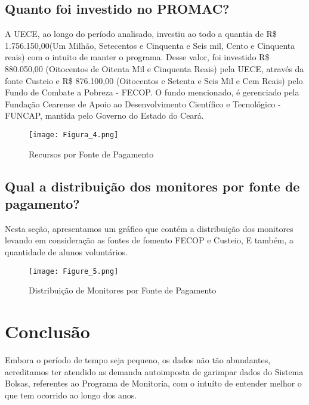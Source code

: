 \documentclass[12pt,a4paper]{article}
\begin{document}
		\subsection{Quanto foi investido no PROMAC?}
		
		A UECE, ao longo do período analisado, investiu ao todo a quantia de R\$ 1.756.150,00(Um Milhão, Setecentos e 					Cinquenta e Seis mil, Cento e Cinquenta reais) com o intuito de manter o programa. Desse valor, foi investido R\$ 				880.050,00 (Oitocentos de Oitenta Mil e Cinquenta Reais) pela UECE, através da fonte Custeio e R\$ 876.100,00 					(Oitocentos e Setenta e Seis Mil e Cem Reais) pelo Fundo de	Combate a Pobreza - FECOP. O fundo mencionado, é 					gerenciado pela Fundação Cearense de Apoio ao Desenvolvimento Científico e Tecnológico - FUNCAP, mantida pelo Governo 		do Estado do Ceará.
		
			\begin{figure}[htb]
        		\centering
        		\texttt{[image: Figura\_4.png]}
        		\caption{Recursos por Fonte de Pagamento}
        		\label{Monitores-Centro/Faculdade}
    		\end{figure}
    		
    	\pagebreak

		\subsection{Qual a distribuição dos monitores por fonte de pagamento?}
		
		Nesta seção, apresentamos um gráfico que contém a distribuição dos monitores levando em consideração as fontes de 				fomento FECOP e Custeio, E também, a quantidade de alunos voluntários.
		
			
			\begin{figure}[htb]
        		\centering
        		\texttt{[image: Figure\_5.png]}
        		\caption{Distribuição de Monitores por Fonte de Pagamento}
        		\label{Monitores por Fonte de Pagamento}
    		\end{figure}
    		
    \section{Conclusão}
    	Embora o período de tempo seja pequeno, os dados não tão abundantes, acreditamos ter atendido as demanda autoimposta 			de garimpar dados do Sistema Bolsas, referentes ao Programa de Monitoria, com o intuíto de entender melhor o que tem 			ocorrido ao longo dos anos.
    	
\end{document}
